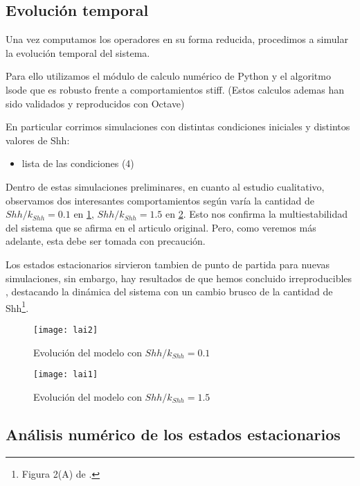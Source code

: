 \subsection{Evolución temporal}
Una vez computamos los operadores en su forma reducida, procedimos a simular la evolución temporal del sistema. 

Para ello utilizamos el módulo de calculo numérico de Python y el algoritmo lsode que es robusto frente a comportamientos stiff. (Estos calculos ademas han sido validados y reproducidos con Octave)

En particular corrimos simulaciones con distintas condiciones iniciales y distintos valores de Shh:

\begin{itemize}
	\item lista de las condiciones (4)
\end{itemize}

Dentro de estas simulaciones preliminares, en cuanto al estudio cualitativo, observamos dos interesantes comportamientos según varía la cantidad de $Shh/k_{Shh}=0.1$ en \ref{lai1}, $Shh/k_{Shh}=1.5$ en \ref{lai2}. Esto nos confirma la multiestabilidad del sistema que se afirma en el articulo original. Pero, como veremos más adelante, esta debe ser tomada con precaución.

Los estados estacionarios sirvieron tambien de punto de partida para nuevas simulaciones, sin embargo, hay resultados de \cite{schaffer} que hemos concluido irreproducibles , destacando la dinámica del sistema con un cambio brusco de la cantidad de Shh\footnote{Figura 2(A) de \cite{schaffer}.}. 



 \begin{figure}[h]
 	\texttt{[image: lai2]}
 	\centering
 	\caption{Evolución del modelo \cite{schaffer} con $Shh/k_{Shh}=0.1$ }
 	\label{lai1}
 \end{figure}


\begin{figure}[h]
	\texttt{[image: lai1]}
	\centering
	\caption{Evolución del modelo \cite{schaffer} con $Shh/k_{Shh}=1.5$}
	\label{lai2}
\end{figure}

\subsection{Análisis numérico de los estados estacionarios}

